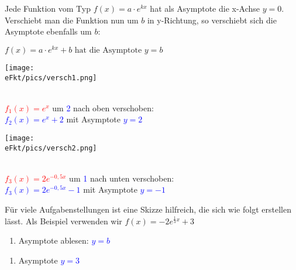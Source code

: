 Jede Funktion vom Typ \(f(x)=a\cdot e^{kx}\) hat als Asymptote die x-Achse \(y=0\). Verschiebt man die Funktion nun um \(b\) in y-Richtung, so verschiebt sich die Asymptote ebenfalls um \(b\):
\begin{tcolorbox}\centering
	\textcolor{loestc}{\(f(x)=a\cdot e^{kx}+b\text{ hat die Asymptote }y=b\)}
\end{tcolorbox}
\begin{minipage}{\textwidth}
	\begin{minipage}{0.49\textwidth}
		\begin{minipage}[t]{0.95\textwidth}
			\texttt{[image: \\eFkt/pics/versch1.png]}
		\end{minipage}\\
		\textcolor{red}{\(f_1(x)=e^x\)} um \textcolor{blue}{2} nach oben verschoben:\\
		\textcolor{blue}{\(f_2(x)=e^x+2\)} mit Asymptote \textcolor{blue}{\(y=2\)}
	\end{minipage}
	\begin{minipage}{0.49\textwidth}
		\begin{minipage}[t]{0.95\textwidth}
			\texttt{[image: \\eFkt/pics/versch2.png]}
		\end{minipage}\\
		\textcolor{red}{\(f_3(x)=2e^{-0,5x}\)} um \textcolor{blue}{1} nach unten verschoben:\\
		\textcolor{blue}{\(f_3(x)=2e^{-0,5x}-1\)} mit Asymptote \textcolor{blue}{\(y=-1\)}
	\end{minipage}
\end{minipage}\vspace{0.5cm}
Für viele Aufgabenstellungen ist eine Skizze hilfreich, die sich wie folgt erstellen lässt. Als Beispiel verwenden wir \(f(x)=-2e^{\frac{1}{3}x}+3\)\\
\begin{minipage}{\textwidth}
	\begin{minipage}[t][\baselineskip][t]{0.49\textwidth}
		\begin{enumerate}[label=\arabic*), leftmargin=*, rightmargin=0.5cm]
			\setcounter{enumi}{0}
			\item Asymptote ablesen: \textcolor{blue}{\(y=b\)}
		\end{enumerate}
	\end{minipage}
	\begin{minipage}[t][\baselineskip][t]{0.49\textwidth}
		\begin{enumerate}[label={}, leftmargin=*]
			\item Asymptote \textcolor{blue}{\(y=3\)}
		\end{enumerate}
	\end{minipage}
\end{minipage}\vspace{0.2cm}
